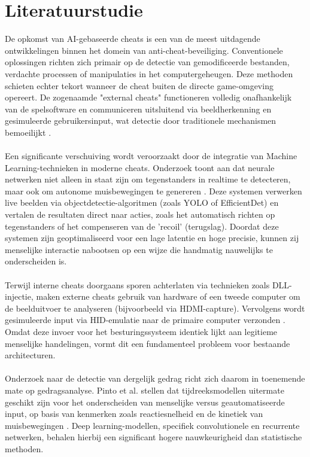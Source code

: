 
\section{Literatuurstudie}
\label{sec:literatuurstudie}

De opkomst van AI-gebaseerde cheats is een van de meest uitdagende ontwikkelingen binnen het domein van anti-cheat-beveiliging. Conventionele oplossingen richten zich primair op de detectie van gemodificeerde bestanden, verdachte processen of manipulaties in het computergeheugen. Deze methoden schieten echter tekort wanneer de cheat buiten de directe game-omgeving opereert. De zogenaamde "external cheats" functioneren volledig onafhankelijk van de spelsoftware en communiceren uitsluitend via beeldherkenning en gesimuleerde gebruikersinput, wat detectie door traditionele mechanismen bemoeilijkt \autocite{Kunstner2024}.
\\\\
Een significante verschuiving wordt veroorzaakt door de integratie van Machine Learning-technieken in moderne cheats. Onderzoek toont aan dat neurale netwerken niet alleen in staat zijn om tegenstanders in realtime te detecteren, maar ook om autonome muisbewegingen te genereren \autocite{Neuman2023}. Deze systemen verwerken live beelden via objectdetectie-algoritmen (zoals YOLO of EfficientDet) en vertalen de resultaten direct naar acties, zoals het automatisch richten op tegenstanders of het compenseren van de 'recoil' (terugslag). Doordat deze systemen zijn geoptimaliseerd voor een lage latentie en hoge precisie, kunnen zij menselijke interactie nabootsen op een wijze die handmatig nauwelijks te onderscheiden is.
\\\\
Terwijl interne cheats doorgaans sporen achterlaten via technieken zoals DLL-injectie, maken externe cheats gebruik van hardware of een tweede computer om de beelduitvoer te analyseren (bijvoorbeeld via HDMI-capture). Vervolgens wordt gesimuleerde input via HID-emulatie naar de primaire computer verzonden \autocite{Liu2020}. Omdat deze invoer voor het besturingssysteem identiek lijkt aan legitieme menselijke handelingen, vormt dit een fundamenteel probleem voor bestaande architecturen.
\\\\
Onderzoek naar de detectie van dergelijk gedrag richt zich daarom in toenemende mate op gedragsanalyse. Pinto et al. stellen dat tijdreeksmodellen uitermate geschikt zijn voor het onderscheiden van menselijke versus geautomatiseerde input, op basis van kenmerken zoals reactiesnelheid en de kinetiek van muisbewegingen \autocite{Pinto2021}. Deep learning-modellen, specifiek convolutionele en recurrente netwerken, behalen hierbij een significant hogere nauwkeurigheid dan statistische methoden.
